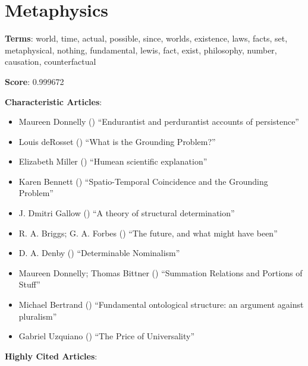 \documentclass[
  10pt,
  letterpaper,
  DIV=11,
  numbers=noendperiod,
  twoside]{scrartcl}
\providecommand{\tightlist}{%
  \setlength{\itemsep}{0pt}\setlength{\parskip}{0pt}}\usepackage{longtable,booktabs,array}
\begin{document}
\section{Metaphysics}\label{metaphysics}

\textbf{Terms}: world, time, actual, possible, since, worlds, existence,
laws, facts, set, metaphysical, nothing, fundamental, lewis, fact,
exist, philosophy, number, causation, counterfactual

\textbf{Score}: 0.999672

\textbf{Characteristic Articles}:

\begin{itemize}
\tightlist
\item
  Maureen Donnelly ()
  ``Endurantist and perdurantist accounts of persistence''
\item
  Louis deRosset () ``What is the
  Grounding Problem?''
\item
  Elizabeth Miller () ``Humean
  scientific explanation''
\item
  Karen Bennett ()
  ``Spatio-Temporal Coincidence and the Grounding Problem''
\item
  J. Dmitri Gallow () ``A theory
  of structural determination''
\item
  R. A. Briggs; G. A. Forbes ()
  ``The future, and what might have been''
\item
  D. A. Denby () ``Determinable
  Nominalism''
\item
  Maureen Donnelly; Thomas Bittner
  () ``Summation Relations and
  Portions of Stuff''
\item
  Michael Bertrand ()
  ``Fundamental ontological structure: an argument against pluralism''
\item
  Gabriel Uzquiano () ``The Price
  of Universality''
\end{itemize}

\textbf{Highly Cited Articles}:
\end{document}
